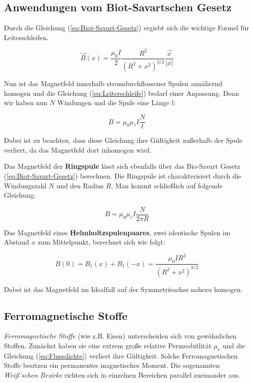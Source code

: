 \subsection{Anwendungen vom Biot-Savartschen Gesetz}

Durch die Gleichung (\ref{eq:Biot-Savart-Gesetz}) ergiebt sich die wichtige Formel für Leiterschleifen.

\begin{equation} \label{eq:Leiterschleife}
    \vec{B}(x) = \frac{\mu_{0}I}{2} \frac{R^2}{(R^2 + x^2)^{3/2}} \frac{\vec{x}}{|x|}
\end{equation}

Nun ist das Magnetfeld innerhalb stromdurchflossener Spulen annähernd homogen und die Gleichung (\ref{eq:Leiterschleife}) bedarf einer Anpassung.
Denn wir haben nun $N$ Windungen und die Spule eine Länge $l$:

\begin{equation} \label{eq:LangeSpule}
    B = \mu_{0}\mu_{r}I \frac{N}{l}
\end{equation}

Dabei ist zu beachten, dass diese Gleichung ihre Gültigkeit außerhalb der Spule verliert, da das Magnetfeld dort inhomogen wird.

Das Magnetfeld der \textbf{Ringspule} lässt sich ebenfalls über das Bio-Savart Gesetz (\ref{eq:Biot-Savart-Gesetz}) berechnen.
Die Ringspule ist charakterisiert durch die Windungszahl $N$ und den Radius $R$.
Man kommt schließlich auf folgende Gleichung:

\begin{equation}
    B = \mu_{0}\mu_{r}I \frac{N}{2\pi R}
\end{equation}

Das Magnetfeld eines \textbf{Helmholtzspulenpaares}, zwei identische Spulen im Abstand $x$ zum Mittelpunkt, berechnet sich wie folgt:

\begin{equation}
    B(0) =  B_{1}(x) +  B_{1}(-x) = \frac {\mu_{0} I R^2} {(R^2 + x^2)^{3/2}}
\end{equation}

Dabei ist das Magnetfeld im Idealfall auf der Symmetrieachse nahezu homogen.

\subsection{Ferromagnetische Stoffe}
\textit{Ferromagnetische Stoffe} (wie z.B. Eisen) unterscheiden sich von gewöhnlichen Stoffen.
Zunächst haben sie eine extrem große relative Permeabitlität $\mu_{r}$ und die Gleichung (\ref{eq:Flussdichte}) verliert ihre Gültigkeit.
Solche Ferromagnetischen Stoffe besitzen ein permanentes magnetisches Moment.
Die sogenannten \textit{Weiß'schen Bezirke} richten sich in einzelnen Bereichen parallel zueinander aus.




